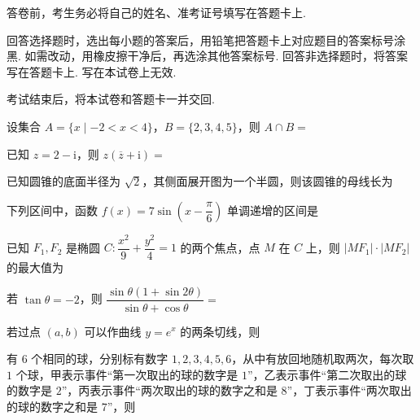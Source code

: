 \documentclass[a4paper,11pt]{report}
\begin{document}
\examfontsize



\noticetitle
\begin{examnotice}
\item 答卷前，考生务必将自己的姓名、准考证号填写在答题卡上. 
\item 回答选择题时，选出每小题的答案后，用铅笔把答题卡上对应题目的答案标号涂黑. 如需改动，用橡皮擦干净后，再选涂其他答案标号. 回答非选择题时，将答案写在答题卡上. 写在本试卷上无效. 
\item 考试结束后，将本试卷和答题卡一并交回. 
\end{examnotice}

\begin{examquestions}

\item 设集合 $A=\{x\mid -2<x<4\}$，$B=\{2,3,4,5\}$，则 $A\cap B=$

\item 已知 $z=2-\mathrm{i}$，则 $z(\overline z+\mathrm{i})=$

\item 已知圆锥的底面半径为 $\sqrt2$，其侧面展开图为一个半圆，则该圆锥的母线长为

\item 下列区间中，函数 $f(x)=7\sin\left(x-\dfrac{\pi}{6}\right)$ 单调递增的区间是
\fourchoices
{}
{}
{}
{}

\item 已知 $F_1,F_2$ 是椭圆 $C:\dfrac{x^2}{9}+\dfrac{y^2}{4}=1$ 的两个焦点，点 $M$ 在 $C$ 上，则 $|MF_1|\cdot|MF_2|$ 的最大值为

\item 若 $\tan\theta=-2$，则 $\dfrac{\sin\theta(1+\sin2\theta)}{\sin\theta+\cos\theta}=$
\fourchoices
{}
{}
{}
{}
\newpage
\item 若过点 $(a,b)$ 可以作曲线 $y=e^x$ 的两条切线，则

\item 有 $6$ 个相同的球，分别标有数字 $1,2,3,4,5,6$，从中有放回地随机取两次，每次取 $1$ 个球，甲表示事件“第一次取出的球的数字是 $1$”，乙表示事件“第二次取出的球的数字是 $2$”，丙表示事件“两次取出的球的数字之和是 $8$”，丁表示事件“两次取出的球的数字之和是 $7$”，则

\end{examquestions}
\end{document}
